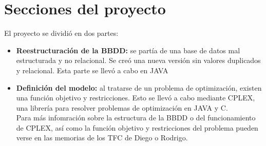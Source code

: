\section{Secciones del proyecto}
El proyecto se dividió en dos partes:
\begin{itemize}
\item \textbf{Reestructuración de la BBDD: }se partía de una base de datos mal estructurada y no relacional. Se creó una nueva versión sin valores duplicados y relacional. Esta parte se llevó a cabo en JAVA
\item \textbf{Definición del modelo: }al tratarse de un problema de optimización, existen una función objetivo y restricciones. Esto se llevó a cabo mediante CPLEX, una librería para resolver problemas de optimización en JAVA y C.\\

Para más infomración sobre la estructura de la BBDD o del funcionamiento de CPLEX, así como la función objetivo y restricciones del problema pueden verse en las memorias de los TFC de Diego o Rodrigo.
\end{itemize}

